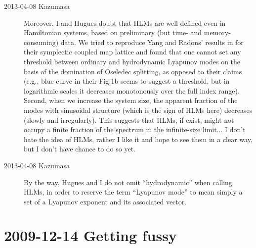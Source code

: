 \begin{description}
\item[2013-04-08 Kazumasa]
Moreover, I and Hugues doubt that HLMs are well-defined
 even in Hamiltonian systems,
 based on preliminary (but time- and memory-consuming) data.
We tried to reproduce Yang and Radons' results
 in 
 for their symplectic coupled map lattice and found that
 one cannot set any threshold between ordinary and hydrodynamic Lyapunov modes
 on the basis of the domination of Oseledec splitting,
 as opposed to their claims
 (e.g., blue curve in their Fig.1b seems to suggest a threshold,
 but in logarithmic scales
 it decreases monotonously over the full index range).
Second, when we increase the system size,
 the apparent fraction of the modes with sinusoidal structure
 (which is the sign of HLMs here) decreases (slowly and irregularly).
This suggests that HLMs, if exist, might not occupy
 a finite fraction of the spectrum in the infinite-size limit...
I don't hate the idea of HLMs, rather I like it and hope to see them
 in a clear way, but I don't have chance to do so yet.

\item[2013-04-08 Kazumasa]                      \inCB
By the way, Hugues and I do not omit ``hydrodynamic'' when calling HLMs,
 in order to reserve the term ``Lyapunov mode'' to mean simply a set
 of a Lyapunov exponent and its associated vector.

\end{description}



\section{2009-12-14 Getting fussy}

